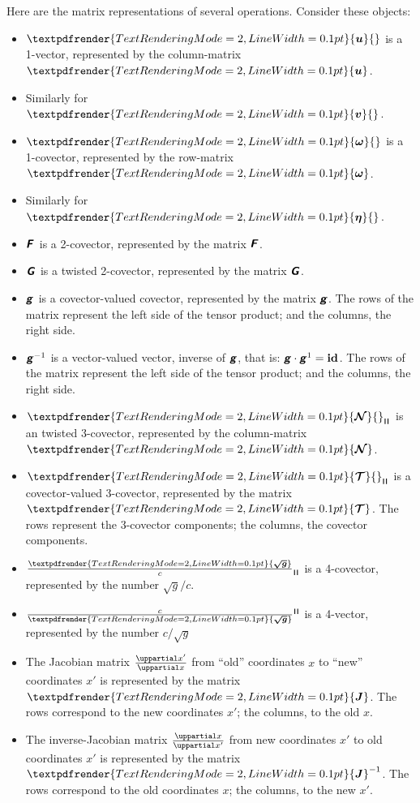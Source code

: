 \documentclass[\ifafour a4paper,12pt,\else a5paper,10pt,\fi%
onecolumn,oneside,article,%
british%
]{memoir}
\makeatletter
\theoremstyle{remark}
\theoremstyle{innote}
\newcommand*{\mathte}[1]{\textbf{\textit{\textsf{#1}}}}
\renewcommand*{\bm}[1]{\textpdfrender{TextRenderingMode=2,LineWidth=0.1pt}{\boldsymbol{#1}}}
\newcommand*{\de}{\mathop{}\!\uppartial}%
\renewcommand*{\|}[1][]{\nonscript\:#1\vert\nonscript\:\mathopen{}}
\newcommand*{\id}{\mathbf{id}}%
\renewcommand*{\i}{{}\indices}
\newcommand*{\q}{}%
\DeclareRobustCommand*{\q}{%
  \mathord{\mathpalette\bigcdot@{}}%
}
\newcommand*{\bigcdot@scalefactor}{0.7}
\newcommand*{\bigcdot@widthfactor}{1.5}
\newcommand*{\bigcdot@}[2]{%
  \sbox0{$#1\vcenter{}$}%
  \sbox2{$#1\cdot\m@th$}%
  \hbox to \bigcdot@widthfactor\wd2{%
    \hfil
    \raise\ht0\hbox{%
      \scalebox{\bigcdot@scalefactor}{%
        \lower\ht0\hbox{$#1\bullet\m@th$}%
      }%
    }%
    \hfil
  }%
}
\newcommand*{\rul}{{\mkern2mu\rule[-0.1ex]{0.75pt}{1.1ex}\mkern2mu}}
\DeclarePairedDelimiter\mul{\rul}{\rul}%
\newcommand*{\yg}{\mathte{g}}
\newcommand*{\dg}{\sqrt{g}}
\newcommand*{\ve}{\tfrac{\bm{\sqrt{g}}}{c}}
\newcommand*{\vi}{\tfrac{c}{\bm{\sqrt{g}}}}
\newcommand*{\yN}{\bm{\mathcal{N}}}
\newcommand*{\yTT}{\bm{\mathcal{T}}}
\newcommand*{\yu}{\bm{u}}
\newcommand*{\yv}{\bm{v}}
\newcommand*{\yo}{\bm{\omega}}
\newcommand*{\yh}{\bm{\eta}}
\newcommand*{\yJ}{\bm{J}}
\newcommand*{\yF}{\mathte{F}}
\newcommand*{\yG}{\mathte{G}}
\makeatother
\begin{document}
Here are the matrix representations of several operations. Consider these objects:
\begin{itemize}
\item $\yu\i{^{\q}}$ is a 1-vector, represented by the column-matrix $\yu$.
\item Similarly for $\yv\i{^{\q}}$.
\item $\yo\i{_{\q}}$ is a 1-covector, represented by the row-matrix $\yo$.
\item Similarly for $\yh\i{_{\q}}$.
\item $\yF\i{_{\q\q}}$ is a 2-covector, represented by the matrix $\yF$.
\item $\yG\i{_{\q\q}}$ is a twisted 2-covector, represented by the matrix $\yG$.
\item $\yg\i{_{\q\q}}$ is a covector-valued covector, represented by the matrix $\yg$. The rows of the matrix represent the left side of the tensor product; and the columns, the right side.
\item ${\yg^{-1}}\i{^{\q\q}}$ is a vector-valued vector, inverse of $\yg$, that is: $\yg\cdot\yg^{1} = \id\i{_{\q}^{\q}}$. The rows of the matrix represent the left side of the tensor product; and the columns, the right side.

\item $\yN\i{_{\mul{\q\q\q}}}$ is an twisted 3-covector, represented by the column-matrix $\yN$.

\item $\yTT\i{_{\mul{\q\q\q}\q}}$ is a covector-valued 3-covector, represented by the matrix $\yTT$. The rows represent the 3-covector components; the columns, the covector components.
\item $\ve\i{_{\mul{\q\q\q\q}}}$ is a 4-covector, represented by the number $\dg/c$.
\item ${\vi}\i{^{\mul{\q\q\q\q}}}$ is a 4-vector, represented by the number $c/\dg$
\item The Jacobian matrix $\frac{\de x'}{\de x}$ from \enquote{old} coordinates $x$ to \enquote{new} coordinates $x'$ is represented by the matrix $\yJ$. The rows correspond to the new coordinates $x'$; the columns, to the old $x$.

\item The inverse-Jacobian matrix $\frac{\de x}{\de x'}$ from new coordinates $x'$ to old coordinates $x'$ is represented by the matrix $\yJ^{-1}$. The rows correspond to the old coordinates $x$; the columns, to the new $x'$.
\end{itemize}
\end{document}
